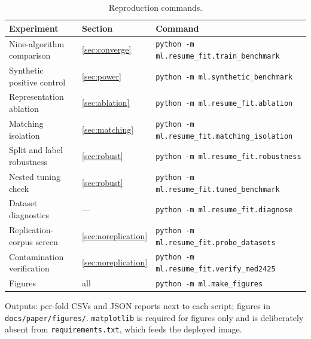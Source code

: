 \documentclass[11pt]{article}                      %
\newcommand{\tabfont}{\footnotesize}
\begin{document}
\begin{table}[h]
\centering\tabfont
\caption{Reproduction commands.}
\begin{tabular}{lll}
\toprule
Experiment & Section & Command \\
\midrule
Nine-algorithm comparison & \ref{sec:converge} & \texttt{python -m ml.resume\_fit.train\_benchmark} \\
Synthetic positive control & \ref{sec:power} & \texttt{python -m ml.synthetic\_benchmark} \\
Representation ablation & \ref{sec:ablation} & \texttt{python -m ml.resume\_fit.ablation} \\
Matching isolation & \ref{sec:matching} & \texttt{python -m ml.resume\_fit.matching\_isolation} \\
Split and label robustness & \ref{sec:robust} & \texttt{python -m ml.resume\_fit.robustness} \\
Nested tuning check & \ref{sec:robust} & \texttt{python -m ml.resume\_fit.tuned\_benchmark} \\
Dataset diagnostics & --- & \texttt{python -m ml.resume\_fit.diagnose} \\
Replication-corpus screen & \ref{sec:noreplication} & \texttt{python -m ml.resume\_fit.probe\_datasets} \\
Contamination verification & \ref{sec:noreplication} & \texttt{python -m ml.resume\_fit.verify\_med2425} \\
Figures & all & \texttt{python -m ml.make\_figures} \\
\bottomrule
\end{tabular}
\end{table}

Outputs: per-fold CSVs and JSON reports next to each script; figures in
\texttt{docs/paper/figures/}. \texttt{matplotlib} is required for figures only
and is deliberately absent from \texttt{requirements.txt}, which feeds the
deployed image.
\end{document}
